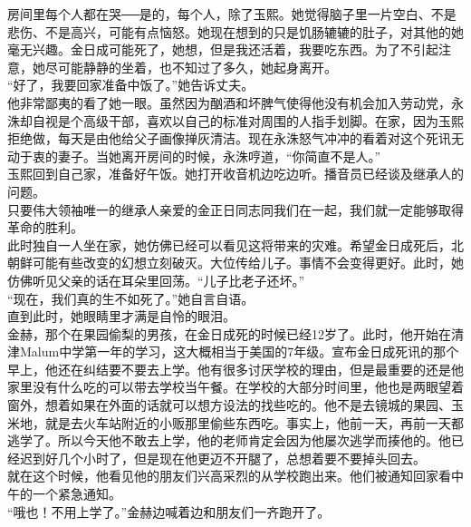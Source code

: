 \begin{multicols}{\theparacolNo}
房间里每个人都在哭──是的，每个人，除了玉熙。她觉得脑子里一片空白、不是悲伤、不是高兴，可能有点恼怒。她现在想到的只是饥肠辘辘的肚子，对其他的她毫无兴趣。金日成可能死了，她想，但是我还活着，我要吃东西。为了不引起注意，她尽可能静静的坐着，也不知过了多久，她起身离开。\\

“好了，我要回家准备中饭了。”她告诉丈夫。\\

他非常鄙夷的看了她一眼。虽然因为酗酒和坏脾气使得他没有机会加入劳动党，永洙却自视是个高级干部，喜欢以自己的标准对周围的人指手划脚。在家，因为玉熙拒绝做，每天是由他给父子画像掸灰清洁。现在永洙怒气冲冲的看着对这个死讯无动于衷的妻子。当她离开房间的时候，永洙哼道，“你简直不是人。”\\

玉熙回到自己家，准备好午饭。她打开收音机边吃边听。播音员已经谈及继承人的问题。\\

只要伟大领袖唯一的继承人亲爱的金正日同志同我们在一起，我们就一定能够取得革命的胜利。\\

此时独自一人坐在家，她仿佛已经可以看见这将带来的灾难。希望金日成死后，北朝鲜可能有些改变的幻想立刻破灭。大位传给儿子。事情不会变得更好。此时，她仿佛听见父亲的话在耳朵里回荡。“儿子比老子还坏。”\\

“现在，我们真的生不如死了。”她自言自语。\\

直到此时，她眼睛里才满是自怜的眼泪。\\

金赫，那个在果园偷梨的男孩，在金日成死的时候已经12岁了。此时，他开始在清津Malum中学第一年的学习，这大概相当于美国的7年级。宣布金日成死讯的那个早上，他还在纠结要不要去上学。他有很多讨厌学校的理由，但是最重要的还是他家里没有什么吃的可以带去学校当午餐。在学校的大部分时间里，他也是两眼望着窗外，想着如果在外面的话就可以想方设法的找些吃的。他不是去镜城的果园、玉米地，就是去火车站附近的小贩那里偷些东西吃。事实上，他前一天，再前一天都逃学了。所以今天他不敢去上学，他的老师肯定会因为他屡次逃学而揍他的。他已经迟到好几个小时了，但是现在他更迈不开腿了，总想着要不要掉头回去。\\

就在这个时候，他看见他的朋友们兴高采烈的从学校跑出来。他们被通知回家看中午的一个紧急通知。\\

“哦也！不用上学了。”金赫边喊着边和朋友们一齐跑开了。\\


\end{multicols}

